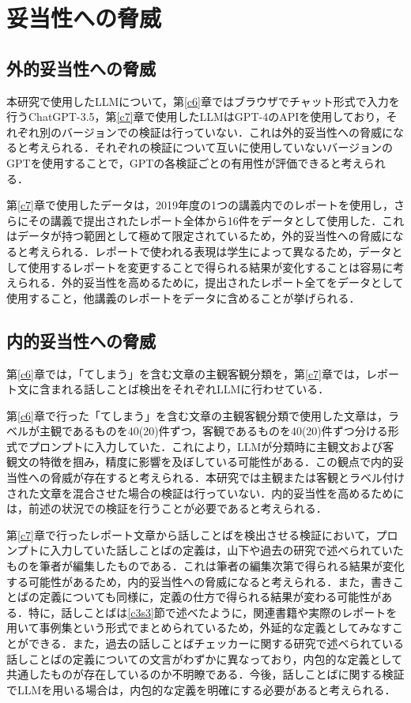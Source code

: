 \chapter{妥当性への脅威 \label{c8}}

\section{外的妥当性への脅威 \label{c8s1}}
本研究で使用したLLMについて，第\ref{c6}章ではブラウザでチャット形式で入力を行うChatGPT-3.5，第\ref{c7}章で使用したLLMはGPT-4のAPIを使用しており，それぞれ別のバージョンでの検証は行っていない．これは外的妥当性への脅威になると考えられる．それぞれの検証について互いに使用していないバージョンのGPTを使用することで，GPTの各検証ごとの有用性が評価できると考えられる．

第\ref{c7}章で使用したデータは，2019年度の1つの講義内でのレポートを使用し，さらにその講義で提出されたレポート全体から16件をデータとして使用した．これはデータが持つ範囲として極めて限定されているため，外的妥当性への脅威になると考えられる．レポートで使われる表現は学生によって異なるため，データとして使用するレポートを変更することで得られる結果が変化することは容易に考えられる．外的妥当性を高めるために，提出されたレポート全てをデータとして使用すること，他講義のレポートをデータに含めることが挙げられる．

\section{内的妥当性への脅威}
第\ref{c6}章では，「てしまう」を含む文章の主観客観分類を，第\ref{c7}章では，レポート文に含まれる話しことば検出をそれぞれLLMに行わせている．

第\ref{c6}章で行った「てしまう」を含む文章の主観客観分類で使用した文章は，ラベルが主観であるものを40(20)件ずつ，客観であるものを40(20)件ずつ分ける形式でプロンプトに入力していた．これにより，LLMが分類時に主観文および客観文の特徴を掴み，精度に影響を及ぼしている可能性がある．この観点で内的妥当性への脅威が存在すると考えられる．本研究では主観または客観とラベル付けされた文章を混合させた場合の検証は行っていない．内的妥当性を高めるためには，前述の状況での検証を行うことが必要であると考えられる．

第\ref{c7}章で行ったレポート文章から話しことばを検出させる検証において，プロンプトに入力していた話しことばの定義は，山下や過去の研究で述べられていたものを筆者が編集したものである．これは筆者の編集次第で得られる結果が変化する可能性があるため，内的妥当性への脅威になると考えられる．また，書きことばの定義についても同様に，定義の仕方で得られる結果が変わる可能性がある．特に，話しことばは\ref{c3s3}節で述べたように，関連書籍や実際のレポートを用いて事例集という形式でまとめられているため，外延的な定義としてみなすことができる．また，過去の話しことばチェッカーに関する研究で述べられている話しことばの定義についての文言がわずかに異なっており，内包的な定義として共通したものが存在しているのか不明瞭である．今後，話しことばに関する検証でLLMを用いる場合は，内包的な定義を明確にする必要があると考えられる．